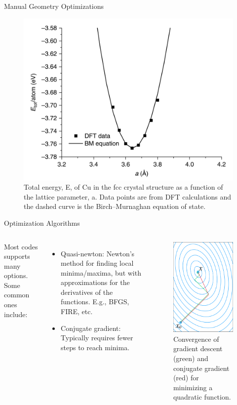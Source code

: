 \documentclass[aspectratio=169]{beamer}
\begin{document}
\begin{frame}{Manual Geometry Optimizations}
\begin{figure}
    \centering
    \includegraphics[width=0.45\linewidth]{lectures/figures/8_Cu_EOS.png}
    \caption{Total energy, E, of Cu in the fcc crystal structure as a function of the lattice parameter, a. Data points are from DFT calculations and the dashed curve is the Birch–Murnaghan equation of state.\cite{shollDensityFunctionalTheory2009}}
\end{figure} 
\end{frame}


\begin{frame}{Optimization Algorithms}

\begin{columns}
Most codes supports many options. Some common ones include:
\begin{itemize}
    \item Quasi-newton: Newton's method for finding local minima/maxima, but with approximations for the derivatives of the functions. E.g., BFGS, FIRE, etc.
    \item Conjugate gradient: Typically requires fewer steps to reach minima. 
\end{itemize}
\begin{figure}
    \centering
    \includegraphics[width=0.5\linewidth]{lectures/figures/8_conjugate_gradient.png}
    \caption{Convergence of gradient descent (green) and conjugate gradient (red) for minimizing a quadratic function.}
    \end{figure} 
\end{columns} 

\end{frame} 
\end{document}
